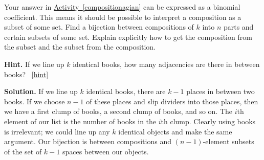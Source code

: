 \documentclass{book}
\begin{document}
\setcounter{project}{129}
\addtocounter{project}{-1}
\begin{activity}[]\label{activity-122}
\hypertarget{p-906}{}%
Your answer in \hyperref[compositionagian]{Activity~\ref{compositionagian}} can be expressed as a binomial coefficient. This means it should be possible to interpret a composition as a subset of some set. Find a bijection between compositions of \(k\) into \(n\) parts and certain subsets of some set.  Explain explicitly how to get the composition from the subset and the subset from the composition.%
\par\smallskip%
\noindent\textbf{Hint.}\hypertarget{hint-87}{}\quad%
\hypertarget{p-907}{}%
If we line up \(k\) identical books, how many adjacencies are there in between books?%
~\hfill{\tiny\hyperlink{a-129}{[hint]}\hypertarget{q-129}{}}\par\smallskip%
\noindent\textbf{Solution.}\hypertarget{solution-97}{}\quad%
\hypertarget{p-908}{}%
If we line up \(k\) identical books, there are \(k-1\) places in between two books. If we choose \(n-1\) of these places and slip dividers into those places, then we have a first clump of books, a second clump of books, and so on. The \(i\)th element of our list is the number of books in the \(i\)th clump. Clearly using books is irrelevant; we could line up any \(k\) identical objects and make the same argument. Our bijection is between compositions and \((n-1)\)-element subsets of the set of \(k-1\) spaces between our objects.%
\end{activity}
\end{document}
